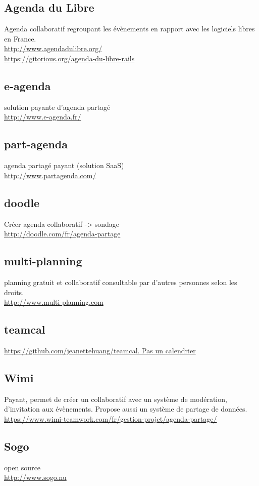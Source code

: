 \documentclass[a4paper,10pt]{article}
\begin{document}
\subsection*{Agenda du Libre}
Agenda collaboratif regroupant les évènements en rapport avec les logiciels libres en France.\\
\url{http://www.agendadulibre.org/}\\	
\url{https://gitorious.org/agenda-du-libre-rails}
\subsection*{e-agenda}
solution payante d'agenda partagé\\
\url{http://www.e-agenda.fr/}
\subsection*{part-agenda}
agenda partagé payant (solution SaaS)\\
\url{http://www.partagenda.com/}
\subsection*{doodle}
Créer agenda collaboratif -> sondage\\
\url{http://doodle.com/fr/agenda-partage}
\subsection*{multi-planning}
planning gratuit et collaboratif consultable par d'autres personnes selon les droits.\\
\url{http://www.multi-planning.com}
\subsection*{teamcal}
\url{https://github.com/jeanettehuang/teamcal. Pas un calendrier}
\subsection*{Wimi}
Payant, permet de créer un collaboratif avec un système de modération, d'invitation aux évènements. Propose aussi un système de partage de données.\\
\url{https://www.wimi-teamwork.com/fr/gestion-projet/agenda-partage/}
\subsection*{Sogo}
open source\\
\url{http://www.sogo.nu}\\
\end{document}
